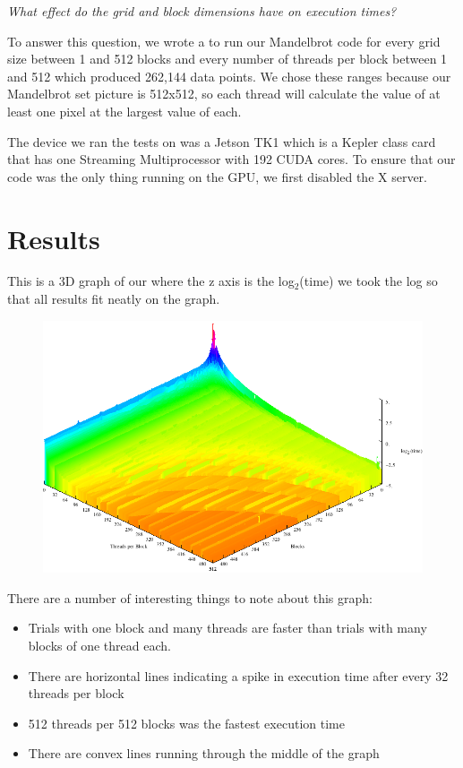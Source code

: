 \documentclass[letterpaper,10pt,openany,oneside]{sphinxmanual}
\begin{document}
\emph{What effect do the grid and block dimensions have
on execution times?}

To answer this question, we wrote a
 to run our Mandelbrot code
for every
grid size between 1 and 512  blocks and every number of threads
per block between 1 and 512 which produced 262,144 data
points. We chose these ranges because our Mandelbrot set picture is
512x512, so each thread will calculate the value of at least
one pixel at the largest value of each.

The device we ran the tests on was a Jetson TK1 which is
a Kepler class card that has
one Streaming Multiprocessor with 192 CUDA cores. To ensure
that our code was the only thing running on the GPU, we
first disabled the X server.


\section{Results}
\label{2-Findings/Findings:results}
This is a 3D graph of our 
where the z axis is the
log$_{\text{2}}$(time) we took the log so that all results
fit neatly on the graph.
\begin{figure}[htbp]
\centering

\includegraphics{MediumPlot.png}
\end{figure}

There are a number of interesting things to note about this
graph:
\begin{itemize}
\item {} 
Trials with one block and many threads are faster than
trials with many blocks of one thread each.

\item {} 
There are horizontal lines indicating a spike in execution
time after every 32 threads per block

\item {} 
512 threads per 512 blocks was the fastest execution time

\item {} 
There are convex lines running through the middle of the
graph

\end{itemize}
\end{document}
